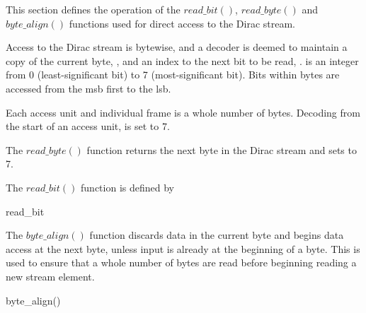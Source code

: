 \label{bitpacking}

This section defines the operation of the $read\_bit()$, $read\_byte()$ 
and $byte\_align()$ functions used for direct access to the Dirac stream.

Access to the Dirac stream is bytewise, and a decoder is deemed to maintain
a copy of the current byte, \CurrentByte, and an index to the next bit
to be read, \NextBit. \NextBit is an integer from 0 (least-significant bit) to 7 
(most-significant bit). Bits within bytes are accessed from the msb first to the
lsb.

Each access unit and individual frame is a whole number of bytes. Decoding from the
start of an access unit, \NextBit is set to 7.

The $read\_byte()$ function returns the next byte in the Dirac stream and sets
\NextBit to 7.

The $read\_bit()$ function is defined by

\begin{pseudo}{read\_bit}{}
\bsEND
{}
\end{pseudo}

The $byte\_align()$ function discards data in the current byte and begins data access
at the next byte, unless input is already at the beginning of a byte. This is used to 
ensure that a whole number of bytes are read before
beginning reading a new stream element.

\begin{pseudo}{byte\_align()}{}
\bsEND
\end{pseudo}
